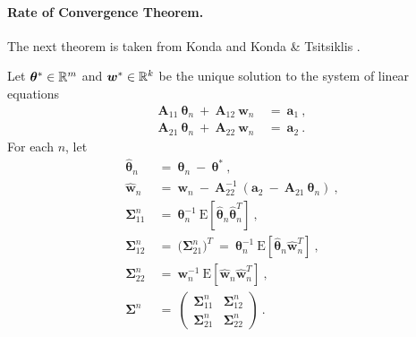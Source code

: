 \documentclass{article}
\newcommand\Ba{\bm{a}}
\newcommand\Bw{\bm{w}}
\newcommand\BA{\bm{A}}
\newcommand\Bth{\bm{\theta}}
\newcommand\BSi{\bm{\Sigma}}
\newcommand{\rE}{\mathrm{E}} \newcommand{\rF}{\mathrm{F}}
\begin{document}
\paragraph{Rate of Convergence Theorem.}

The next theorem is taken from  Konda
\cite{Konda:02} and Konda \& Tsitsiklis \cite{Konda:04}.

Let $\Bth^{*} \in \dR^m$ and $\Bw^{*} \in \dR^k$ be the unique
solution to the system of linear equations
\begin{align}
\label{eq:Linear1}
\BA_{11} \ \Bth_n \ + \ \BA_{12} \ \Bw_n \ &= \ \Ba_1 \ , \\
\label{eq:Linear2}
\BA_{21} \ \Bth_n \ + \ \BA_{22} \ \Bw_n   \ &= \ \Ba_2 \ .
\end{align}
For each $n$, let
\begin{align}
\hat{\Bth}_n \ &= \ \Bth_n \ - \ \Bth^{*} \ ,\\
\hat{\Bw}_n \ &= \ \Bw_n \ - \ \BA_{22}^{-1} \ \left(\Ba_2 \ - \
\BA_{21} \ \Bth_n \right) \ ,\\
\BSi_{11}^n \ &= \ \Bth_n^{-1} \ \rE\left[ \hat{\Bth}_n \hat{\Bth}_n^T\right]\ ,\\
\BSi_{12}^n \ &= \ \big( \BSi_{21}^n \big)^T \ = \
\Bth_n^{-1} \ \rE\left[ \hat{\Bth}_n \hat{\Bw}_n^T\right]\ ,\\
\BSi_{22}^n \ &= \ \Bw_n^{-1} \ \rE\left[ \hat{\Bw}_n \hat{\Bw}_n^T\right]\ ,\\
\BSi^n \ &= \
\begin{pmatrix}
\BSi_{11}^n & \BSi_{12}^n \\
\BSi_{21}^n & \BSi_{22}^n
\end{pmatrix} \ .
\end{align}
\end{document}

